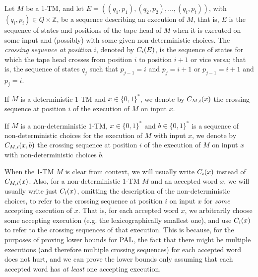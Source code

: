 \begin{definition}
Let $M$ be a 1-TM, and let $E = ((q_1, p_1), (q_2, p_2), \dots, (q_t, p_t))$, 
with $(q_i, p_i) \in Q \times \mathbb{Z}$, be a sequence describing an execution of
$M$, that is, $E$ is the sequence of states and positions of the tape head of $M$ when
it is executed on some input and (possibly) with some given non-deterministic choices.
The \emph{crossing sequence at position $i$}, denoted by $C_i(E)$,
is the sequence of states for 
which the tape head crosses from position $i$ to position $i+1$ or vice versa; that is, the
sequence of states $q_j$
such that $p_{j-1} = i$ and $p_{j} = i+1$ or $p_{j-1} = i+1$ and $p_j = i$. 

If $M$ is a deterministic 1-TM and $x \in \{0, 1\}^*$, we denote by $C_{M,i}(x)$ 
the crossing sequence at position $i$ of the execution of $M$ on input $x$. 

If $M$ is a non-deterministic 1-TM, $x \in \{0, 1\}^*$ and $b \in \{0, 1\}^*$ is a 
sequence of non-deterministic choices for the execution of $M$ with input $x$,
we denote by $C_{M,i}(x, b)$ the crossing sequence at position $i$ of the execution of $M$ on
input $x$ with non-deterministic choices $b$.

\end{definition}

\begin{figure}
\label{fig:crossingsequences}
\end{figure}

When the 1-TM $M$ is clear from context, we will usually write $C_i(x)$ instead of $C_{M,i}(x)$.
Also, for a non-deterministic 1-TM $M$ and an accepted word $x$, 
we will usually write just $C_i(x)$, omitting the description of 
the non-deterministic choices, to refer to the crossing sequence at position $i$ on input $x$
for \emph{some} accepting execution of $x$. That is, for each accepted word $x$, we arbitrarily choose
some accepting execution (e.g. the lexicographically smallest one), and use $C_i(x)$ to refer to the
crossing sequences of that execution. This is because, for the purposes of proving lower bounds for $\mathrm{PAL}$,
the fact that there might be multiple executions (and therefore multiple crossing sequences) for each accepted
word does not hurt, and we can prove the lower bounds only assuming that each accepted word has \emph{at least}
one accepting execution.

